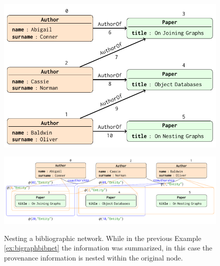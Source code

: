 \begin{figure}[!t]
	\centering
	\begin{minipage}[!t]{0.6\textwidth}
		\centering
		\includegraphics[width=1\textwidth]{fig/06nesting/04bibliography}
		\label{fig:inputbibex2}
	\end{minipage}
\medskip

	\begin{minipage}[!t]{\textwidth}
		\centering
		\includegraphics[width=\textwidth]{fig/06nesting/042nested}
		\label{fig:outputnested}
	\end{minipage}
	\caption{Nesting a bibliographic network. While in the previous Example \vref{ex:bigraphbibnet} the information was summarized, in this case the provenance information is nested within the original node. }
	\label{fig:bibex2}
\end{figure}

